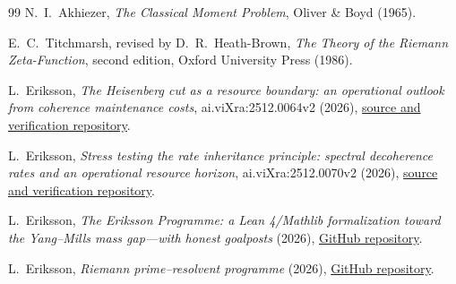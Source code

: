 \documentclass[11pt,a4paper]{article}
\theoremstyle{definition}
\theoremstyle{remark}
\begin{document}
\begin{thebibliography}{99}
N.~I.~Akhiezer, \emph{The Classical Moment Problem}, Oliver \& Boyd (1965).

E.~C.~Titchmarsh, revised by D.~R.~Heath-Brown, \emph{The Theory of the Riemann
Zeta-Function}, second edition, Oxford University Press (1986).

L.~Eriksson, \emph{The Heisenberg cut as a resource boundary: an operational
outlook from coherence maintenance costs}, ai.viXra:2512.0064v2 (2026),
\href{https://github.com/lluiseriksson/aqft-split-inclusion-series/tree/main/papers/0064-heisenberg-cut}
{source and verification repository}.

L.~Eriksson, \emph{Stress testing the rate inheritance principle: spectral
decoherence rates and an operational resource horizon}, ai.viXra:2512.0070v2
(2026),
\href{https://github.com/lluiseriksson/aqft-split-inclusion-series/tree/main/papers/0070-rate-inheritance}
{source and verification repository}.

L.~Eriksson, \emph{The Eriksson Programme: a Lean 4/Mathlib formalization
toward the Yang--Mills mass gap---with honest goalposts} (2026),
\href{https://github.com/lluiseriksson/THE-ERIKSSON-PROGRAMME}
{GitHub repository}.

L.~Eriksson, \emph{Riemann prime--resolvent programme} (2026),
\href{https://github.com/lluiseriksson/riemann-prime-resolvent}
{GitHub repository}.

\end{thebibliography}
\end{document}
